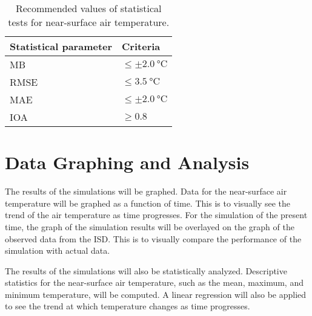 	\begin{table}	
		\caption{Recommended values of statistical tests for near-surface air temperature.}
		\label{tab:performance-statistics-threshold}
		\centering
		\begin{tabular}{l l}
			\hline \hline
			Statistical parameter & Criteria\\
			\hline
			MB & $\leq \pm \qty{2.0}{\degreeCelsius}$ \\
			RMSE & $\leq \qty{3.5}{\degreeCelsius}$\\
			MAE & $\leq \pm \qty{2.0}{\degreeCelsius}$\\
			IOA	& $\geq \num{0.8}$\\
			\hline
		\end{tabular}		
	\end{table}

\section{Data Graphing and Analysis}
	The results of the simulations will be graphed.
	Data for the near-surface air temperature will be graphed as a function of time.
	This is to visually see the trend of the air temperature as time progresses.
	For the simulation of the present time, the graph of the simulation results will be overlayed on the graph of the observed data from the ISD.
	This is to visually compare the performance of the simulation with actual data.
	
	The results of the simulations will also be statistically analyzed.
	Descriptive statistics for the near-surface air temperature, such as the mean, maximum, and minimum temperature, will be computed.
	A linear regression will also be applied to see the trend at which temperature changes as time progresses.